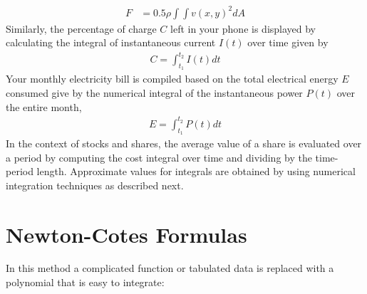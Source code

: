 \documentclass[book.tex]{subfiles}
\begin{document}
\begin{align}
F &= 0.5\rho\int\int v(x,y)^2 dA
\end{align}
Similarly, the percentage of charge $C$ left in your phone is displayed by calculating the integral of instantaneous current $I(t)$ over time given by 
\begin{align}
C = \int_{t_1}^{t_2} I(t) dt
\end{align}
Your monthly electricity bill is compiled based on the total electrical energy $E$ consumed give by the numerical integral of the instantaneous power $P(t)$ over the entire month, 
\begin{align}
E = \int_{t_1}^{t_2} P(t) dt
\end{align}
In the context of stocks and shares, the average value of a share is evaluated over a period by computing the cost integral over time and dividing by the time-period length. Approximate values for integrals are obtained by using numerical integration techniques as described next. 


\section{Newton-Cotes Formulas}

In this method a complicated function or tabulated data is replaced with a polynomial that is easy to integrate:
\end{document}
